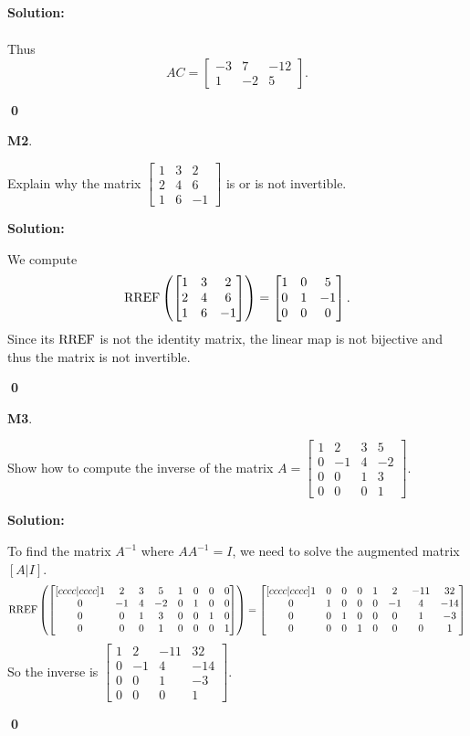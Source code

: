 \documentclass{article}
\newenvironment{problem}[1]
{
  \begin{flushleft}
  \textbf{#1}.
  \ignorespaces
}
{
  \end{flushleft}
}
\newenvironment{solution}
{
  \ignorespaces
  \textbf{Solution:}
}
{
  \ignorespacesafterend
  \begin{flushright}
  {\bfseries \qed}
  \end{flushright}
}
\begin{document}
\begin{solution}
\begin{align*}
\end{align*}
Thus
\[AC = \begin{bmatrix} -3 & 7 & -12 \\ 1 & -2 & 5 \end{bmatrix}.\]
\end{solution}

\begin{problem}{M2}
Explain why the matrix \(\begin{bmatrix}1 & 3 & 2  \\ 2 & 4 & 6  \\ 1 & 6 & -1 \end{bmatrix}\) is or is not invertible.
\end{problem}
\begin{solution}
We compute
\[\operatorname{RREF}\left(\begin{bmatrix}1 & 3 & 2  \\ 2 & 4 & 6  \\ 1 & 6 & -1 \end{bmatrix}\right) = \begin{bmatrix} 1 & 0 & 5 \\ 0 & 1 & -1 \\ 0 & 0 & 0 \end{bmatrix}.\]
Since its \(\operatorname{RREF}\) is not the identity matrix, the linear map is not bijective and thus the matrix is not invertible.
\end{solution}

\begin{problem}{M3}
Show how to compute the inverse of the matrix
\(A=\begin{bmatrix}
1 & 2 & 3 & 5 \\ 0 & -1 & 4 & -2 \\ 0 & 0 & 1 & 3 \\ 0 & 0 & 0 & 1
\end{bmatrix}\).
\end{problem}
\begin{solution}
To find the matrix \(A^{-1}\) where \(AA^{-1}=I\), we need to solve the augmented matrix \([A|I]\).
\[\operatorname{RREF}\left(\begin{bmatrix}[cccc|cccc] 1 & 2 & 3 & 5 & 1 & 0 & 0 & 0  \\ 0 & -1 & 4 & -2 & 0 & 1 & 0 & 0 \\ 0 & 0 & 1 & 3 & 0 & 0 & 1 & 0 \\ 0 & 0 & 0 & 1 & 0 & 0 & 0 & 1 \end{bmatrix}\right) = \begin{bmatrix}[cccc|cccc] 1 & 0 & 0 &0 & 1 & 2 & -11 & 32 \\ 0 & 1 & 0 & 0 & 0 & -1 & 4 & -14 \\ 0 & 0 & 1 & 0 & 0 & 0 & 1 & -3 \\ 0 & 0 & 0 & 1 & 0 & 0 & 0 & 1 \end{bmatrix}\]
So the inverse is \(\begin{bmatrix}  1 & 2 & -11 & 32 \\ 0 & -1 & 4 & -14 \\  0 & 0 & 1 & -3 \\ 0 & 0 & 0 & 1 \end{bmatrix}\).
\end{solution}
\end{document}
